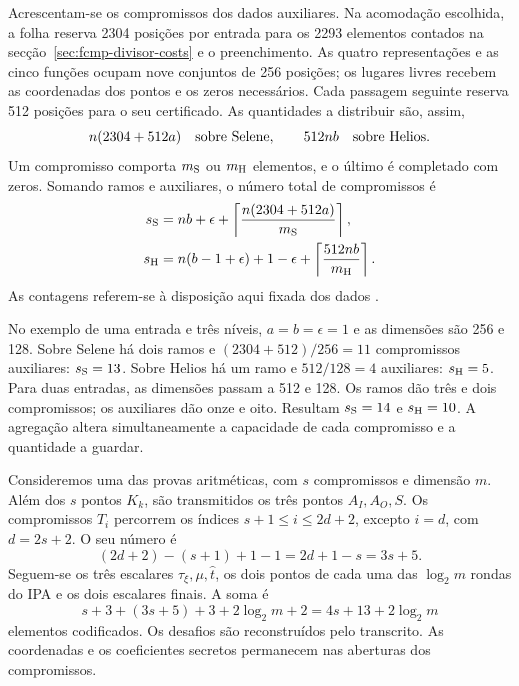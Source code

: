 Acrescentam-se os compromissos dos dados auxiliares.
Na acomodação escolhida, a folha reserva 2304 posições
por entrada para os 2293 elementos contados na
secção~\ref{sec:fcmp-divisor-costs} e o preenchimento.
As quatro representações e as cinco funções ocupam
nove conjuntos de 256 posições; os lugares livres
recebem as coordenadas dos pontos e os zeros necessários.
Cada passagem seguinte reserva 512 posições para o seu
certificado. As quantidades a distribuir são, assim,
\[
 n(2304+512a)\quad\hbox{sobre Selene},\qquad
 512nb\quad\hbox{sobre Helios}.
\]
Um compromisso comporta \(m_{\rm S}\) ou \(m_{\rm H}\)
elementos, e o último é completado com zeros. Somando
ramos e auxiliares, o número total de compromissos é
\begin{equation}
 \begin{aligned}
 s_{\rm S}&=nb+\epsilon+
       \left\lceil\frac{n(2304+512a)}{m_{\rm S}}\right\rceil,\\
 s_{\rm H}&=n(b-1+\epsilon)+1-\epsilon+
       \left\lceil\frac{512nb}{m_{\rm H}}\right\rceil.
 \end{aligned}
 \label{eq:fcmp-commitment-counts}
\end{equation}
As contagens referem-se à disposição aqui fixada dos dados
\cite{monero-oxide-fcmp-source}.

No exemplo de uma entrada e três níveis,
\(a=b=\epsilon=1\) e as dimensões são 256 e 128.
Sobre Selene há dois ramos e
\((2304+512)/256=11\) compromissos auxiliares:
\(s_{\rm S}=13\). Sobre Helios há um ramo e
\(512/128=4\) auxiliares: \(s_{\rm H}=5\).
Para duas entradas, as dimensões passam a 512 e 128.
Os ramos dão três e dois compromissos; os auxiliares
dão onze e oito. Resultam \(s_{\rm S}=14\) e
\(s_{\rm H}=10\). A agregação altera simultaneamente
a capacidade de cada compromisso e a quantidade a guardar.


Consideremos uma das provas aritméticas, com \(s\)
compromissos e dimensão \(m\). Além dos \(s\) pontos
\(K_k\), são transmitidos os três pontos \(A_I,A_O,S\).
Os compromissos \(T_i\) percorrem os índices
\(s+1\leq i\leq2d+2\), excepto \(i=d\), com
\(d=2s+2\). O seu número é
\[
 (2d+2)-(s+1)+1-1=2d+1-s=3s+5.
\]
Seguem-se os três escalares
\(\tau_\xi,\mu,\widehat t\), os dois pontos de cada
uma das \(\log_2m\) rondas do IPA e os dois escalares
finais. A soma é
\[
 s+3+(3s+5)+3+2\log_2m+2
       =4s+13+2\log_2m
\]
elementos codificados. Os desafios são reconstruídos
pelo transcrito. As coordenadas e os coeficientes secretos
permanecem nas aberturas dos compromissos.

